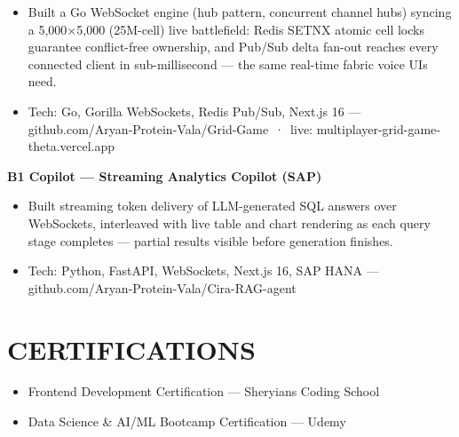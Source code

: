 \documentclass[9pt]{article}
\begin{document}
\begin{itemize}[leftmargin=11pt,itemsep=0pt,topsep=1pt,parsep=0pt]
\item Built a Go WebSocket engine (hub pattern, concurrent channel hubs) syncing a 5,000×5,000 (25M-cell) live battlefield: Redis SETNX atomic cell locks guarantee conflict-free ownership, and Pub/Sub delta fan-out reaches every connected client in sub-millisecond  ---  the same real-time fabric voice UIs need.
\item Tech: Go, Gorilla WebSockets, Redis Pub/Sub, Next.js 16  ---  github.com/Aryan-Protein-Vala/Grid-Game \,·\, live: multiplayer-grid-game-theta.vercel.app
\end{itemize}
\textbf{B1 Copilot  ---  Streaming Analytics Copilot (SAP)}
\vspace{1pt}
\begin{itemize}[leftmargin=11pt,itemsep=0pt,topsep=1pt,parsep=0pt]
\item Built streaming token delivery of LLM-generated SQL answers over WebSockets, interleaved with live table and chart rendering as each query stage completes  ---  partial results visible before generation finishes.
\item Tech: Python, FastAPI, WebSockets, Next.js 16, SAP HANA  ---  github.com/Aryan-Protein-Vala/Cira-RAG-agent
\end{itemize}
\section*{CERTIFICATIONS}
\begin{itemize}[leftmargin=11pt,itemsep=0pt,topsep=1pt,parsep=0pt]
\item Frontend Development Certification  ---  Sheryians Coding School
\item Data Science \& AI/ML Bootcamp Certification  ---  Udemy
\end{itemize}
\end{document}
